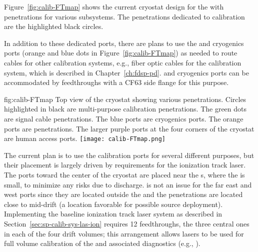 
Figure~\ref{fig:calib-FTmap} shows the current cryostat design for the %
 with penetrations for various subsystems. The penetrations dedicated to calibration are the highlighted black circles. 

In addition to these dedicated ports, there are plans to use the  and cryogenics ports (orange and blue dots in Figure~\ref{fig:calib-FTmap}) as needed to route cables for other calibration systems, e.g., fiber optic cables for the  calibration system, which is described in Chapter~\ref{ch:fdsp-pd}.  and cryogenics ports can be accommodated by feedthroughs with a CF63 side flange for this purpose.   

\begin{dunefigure}{fig:calib-FTmap}
{Top view of the \spmod %
cryostat showing various penetrations. Circles highlighted in black are multi-purpose calibration penetrations. The green dots are  signal cable penetrations. The blue ports are cryogenics ports. The orange ports are  penetrations. The larger purple ports at the four corners of the cryostat are human access ports.}
\texttt{[image: calib-FTmap.png]}
\end{dunefigure}

The current plan is to use the calibration ports for several different purposes, but their placement is largely driven by requirements for the ionization track laser. %
The ports %
toward the center of the cryostat are placed near the s, where the \efield is small, %
to minimize any risks due to %
 discharge.  is not an issue for the far east and west ports since they are located outside the  and the penetrations are located %
close to mid-drift (a location favorable for possible source deployment).
Implementing the baseline ionization track laser system as %
described in Section~\ref{sec:sp-calib-sys-las-ion} requires \num{12} feedthroughs, the three central ones in each of the four  drift volumes; this arrangement allows lasers to be used for full volume calibration of the \efield and associated diagnostics (e.g., ). 

